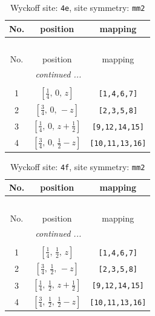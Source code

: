 \documentclass[fleqn,8pt]{jsarticle}
\begin{document}
\renewcommand{\arraystretch}{1.2}
\begin{longtable}{ccc}
\caption{Wyckoff site: {\tt 4e}, site symmetry: {\tt mm2}}
 \\
 \hline \hline
No. & position & mapping \\ \hline \endfirsthead

\multicolumn{2}{l}{\tablename\ \thetable{}} \\
 \hline \hline
No. & position & mapping \\ \hline \endhead

 \hline \hline
\multicolumn{2}{r}{\footnotesize\it continued ...} \\ \endfoot

 \hline \hline
\multicolumn{2}{r}{} \\ \endlastfoot

1 & $\left[ \frac{1}{4},\, 0,\, z \right]$ & {\tt [1,4,6,7]} \\ \hline
2 & $\left[ \frac{3}{4},\, 0,\, - z \right]$ & {\tt [2,3,5,8]} \\ \hline
3 & $\left[ \frac{1}{4},\, 0,\, z + \frac{1}{2} \right]$ & {\tt [9,12,14,15]} \\ \hline
4 & $\left[ \frac{3}{4},\, 0,\, \frac{1}{2} - z \right]$ & {\tt [10,11,13,16]} \\
\end{longtable}
\renewcommand{\arraystretch}{1.2}
\begin{longtable}{ccc}
\caption{Wyckoff site: {\tt 4f}, site symmetry: {\tt mm2}}
 \\
 \hline \hline
No. & position & mapping \\ \hline \endfirsthead

\multicolumn{2}{l}{\tablename\ \thetable{}} \\
 \hline \hline
No. & position & mapping \\ \hline \endhead

 \hline \hline
\multicolumn{2}{r}{\footnotesize\it continued ...} \\ \endfoot

 \hline \hline
\multicolumn{2}{r}{} \\ \endlastfoot

1 & $\left[ \frac{1}{4},\, \frac{1}{2},\, z \right]$ & {\tt [1,4,6,7]} \\ \hline
2 & $\left[ \frac{3}{4},\, \frac{1}{2},\, - z \right]$ & {\tt [2,3,5,8]} \\ \hline
3 & $\left[ \frac{1}{4},\, \frac{1}{2},\, z + \frac{1}{2} \right]$ & {\tt [9,12,14,15]} \\ \hline
4 & $\left[ \frac{3}{4},\, \frac{1}{2},\, \frac{1}{2} - z \right]$ & {\tt [10,11,13,16]} \\
\end{longtable}
\end{document}
